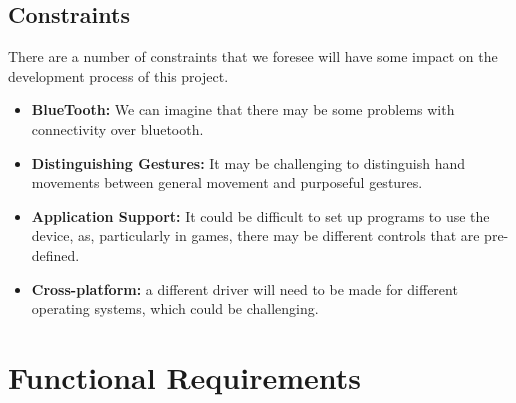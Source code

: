 \documentclass[12pt,a4paper,oneside]{book}
\theoremstyle{plain}
\numberwithin{equation}{chapter}
\begin{document}
\section{Constraints}

\noindent There are a number of constraints that we foresee will have some impact on the development process of this project.

\begin{itemize}
    \item \textbf{BlueTooth:} We can imagine that there may be some problems with connectivity over bluetooth.
    \item \textbf{Distinguishing Gestures:} It may be challenging to distinguish hand movements between general movement and purposeful gestures.
    \item \textbf{Application Support:} It could be difficult to set up programs to use the device, as, particularly in games, there may be different controls that are pre-defined.
    \item \textbf{Cross-platform:} a different driver will need to be made for different operating systems, which could be challenging.
\end{itemize}

\chapter*{Functional Requirements}
\end{document}

